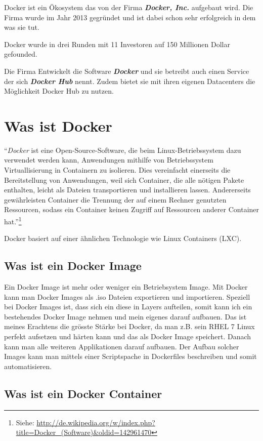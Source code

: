 Docker ist ein Ökosystem das von der Firma \textbf{\textit{Docker, Inc.}} aufgebaut wird.
Die Firma wurde im Jahr 2013 gegründet und ist dabei schon sehr erfolgreich in dem was sie tut.

Docker wurde in drei Runden mit 11 Investoren auf 150 Millionen Dollar gefounded.

Die Firma Entwickelt die Software \textbf{\textit{Docker}} und sie betreibt auch einen Service der sich
\textbf{\textit{Docker Hub}} nennt. Zudem bietet sie mit ihren eigenen Datacenters die Möglichkeit
Docker Hub zu nutzen.

\section{Was ist Docker}

“\textit{Docker} ist eine Open-Source-Software, die beim Linux-Betriebssystem dazu verwendet werden
kann, Anwendungen mithilfe von Betriebssystem Virtuallisierung in Containern zu isolieren.
Dies vereinfacht einerseits die Bereitstellung von Anwendungen, weil sich Container, die
alle nötigen Pakete enthalten, leicht als Dateien transportieren und installieren lassen.
Andererseits gewährleisten Container die Trennung der auf einem Rechner genutzten Ressourcen,
sodass ein Container keinen Zugriff auf Ressourcen anderer Container hat.”\footnote{Siehe: \url{http://de.wikipedia.org/w/index.php?title=Docker_(Software)&oldid=142961470}}

Docker basiert auf einer ähnlichen Technologie wie Linux Containers (LXC).

\subsection{Was ist ein Docker Image}

Ein Docker Image ist mehr oder weniger ein Betriebsystem Image. Mit Docker kann man Docker Images
als .iso Dateien exportieren und importieren. Speziell bei Docker Images ist, dass sich ein diese
in Layers aufteilen, somit kann ich ein bestehendes Docker Image nehmen und mein eigenes darauf
aufbauen. Das ist meines Erachtens die grösste Stärke bei Docker, da man z.B. sein RHEL 7 Linux
perfekt aufsetzen und härten kann und das als Docker Image speichert. Danach kann man alle
weiteren Applikationen darauf aufbauen. Der Aufbau solcher Images kann man mittels einer
Scriptspache in Dockerfiles beschreiben und somit automatisieren.

\subsection{Was ist ein Docker Container}

